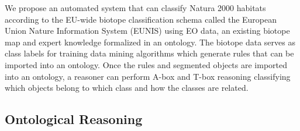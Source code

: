\documentclass[authoryear, review,12pt,number]{elsarticle}
\begin{document}
We propose an automated system that can classify Natura 2000 habitats
according to the EU-wide biotope classification schema called the European 
Union Nature Information System (EUNIS) using EO data, an existing biotope map
and expert knowledge formalized in an ontology. The biotope data serves as class
labels for training data mining algorithms which generate rules that can be
imported into an ontology. Once the rules and segmented objects are imported
into an ontology, a reasoner can perform A-box and T-box reasoning classifying
which objects belong to which class and how the classes are related. 

\subsection{Ontological Reasoning}
\end{document}
